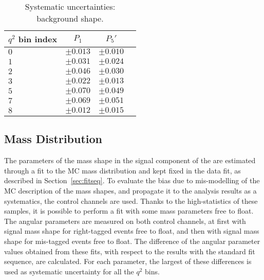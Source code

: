 \begin{table*}[!htb]
  \begin {center}
    \begin{small}
      \caption{Systematic uncertainties: background shape.
        \label{tab:bkg. shape}}
      \begin{tabular}{l|c|c|c}
        $q^2$ bin index & $P_1$ & $P_5'$ \\
        \hline
        $0$ & $\pm0.013$ & $\pm0.010$ \\
        $1$ & $\pm0.031$ & $\pm0.024$ \\
        $2$ & $\pm0.046$ & $\pm0.030$ \\
        $3$ & $\pm0.022$ & $\pm0.013$ \\
        $5$ & $\pm0.070$ & $\pm0.049$ \\
        $7$ & $\pm0.069$ & $\pm0.051$ \\
        $8$ & $\pm0.012$ & $\pm0.015$ \\
      \end{tabular}
    \end{small}
  \end{center}
\end{table*}

\subsection{Mass Distribution}
\label{sec:sys-mass distribution}



The parameters of the mass shape in the signal component of the \pdf are estimated through a fit to the MC mass distribution and kept fixed in the data fit, as described in Section~\ref{sec:fitseq}.
To evaluate the bias due to mis-modelling of the MC description of the mass shapes, and propagate it to the analysis results as a systematics, the control channels are used.
Thanks to the high-statistics of these samples, it is possible to perform a fit with some mass parameters free to float.
The angular parameters are measured on both control channels, at first with signal mass shape for right-tagged events free to float, and then with signal mass shape for mis-tagged events free to float.
The difference of the angular parameter values obtained from these fits, with respect to the results with the standard fit sequence, are calculated.
For each parameter, the largest of these differences is used as systematic uncertainty for all the $q^2$ bins.

